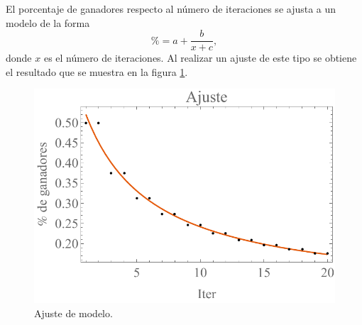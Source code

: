 \documentclass[letterpaper,11pt]{article}
\begin{document}
El porcentaje de ganadores respecto al número de iteraciones se ajusta a un modelo de la forma
\[
	\% = a + \frac{b}{x+c},
\]
donde $x$ es el número de iteraciones. Al realizar un ajuste de este tipo se obtiene el resultado que se muestra en la figura \ref{fig:ajuste}.

\begin{figure}[h!]
\centering
\includegraphics[scale=0.6]{img/Fig9}
\caption{Ajuste de modelo.}
\label{fig:ajuste}
\end{figure}
\end{document}
